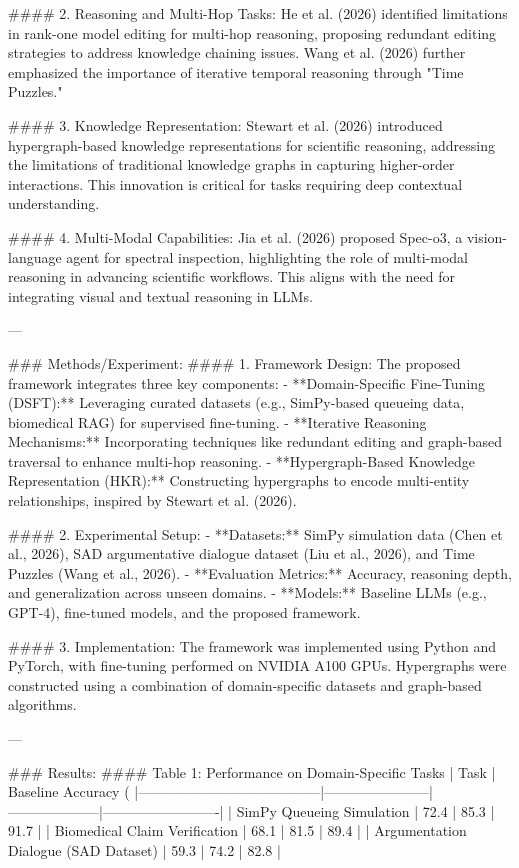 #### 2. Reasoning and Multi-Hop Tasks:
He et al. (2026) identified limitations in rank-one model editing for multi-hop reasoning, proposing redundant editing strategies to address knowledge chaining issues. Wang et al. (2026) further emphasized the importance of iterative temporal reasoning through "Time Puzzles."

#### 3. Knowledge Representation:
Stewart et al. (2026) introduced hypergraph-based knowledge representations for scientific reasoning, addressing the limitations of traditional knowledge graphs in capturing higher-order interactions. This innovation is critical for tasks requiring deep contextual understanding.

#### 4. Multi-Modal Capabilities:
Jia et al. (2026) proposed Spec-o3, a vision-language agent for spectral inspection, highlighting the role of multi-modal reasoning in advancing scientific workflows. This aligns with the need for integrating visual and textual reasoning in LLMs.

---

### Methods/Experiment:
#### 1. Framework Design:
The proposed framework integrates three key components:
- **Domain-Specific Fine-Tuning (DSFT):** Leveraging curated datasets (e.g., SimPy-based queueing data, biomedical RAG) for supervised fine-tuning.
- **Iterative Reasoning Mechanisms:** Incorporating techniques like redundant editing and graph-based traversal to enhance multi-hop reasoning.
- **Hypergraph-Based Knowledge Representation (HKR):** Constructing hypergraphs to encode multi-entity relationships, inspired by Stewart et al. (2026).

#### 2. Experimental Setup:
- **Datasets:** SimPy simulation data (Chen et al., 2026), SAD argumentative dialogue dataset (Liu et al., 2026), and Time Puzzles (Wang et al., 2026).
- **Evaluation Metrics:** Accuracy, reasoning depth, and generalization across unseen domains.
- **Models:** Baseline LLMs (e.g., GPT-4), fine-tuned models, and the proposed framework.

#### 3. Implementation:
The framework was implemented using Python and PyTorch, with fine-tuning performed on NVIDIA A100 GPUs. Hypergraphs were constructed using a combination of domain-specific datasets and graph-based algorithms.

---

### Results:
#### Table 1: Performance on Domain-Specific Tasks
| Task                                  | Baseline Accuracy (%
|---------------------------------------|-----------------------|--------------------|-------------------------|
| SimPy Queueing Simulation             | 72.4                  | 85.3               | 91.7                    |
| Biomedical Claim Verification         | 68.1                  | 81.5               | 89.4                    |
| Argumentation Dialogue (SAD Dataset) | 59.3                  | 74.2               | 82.8                    |

